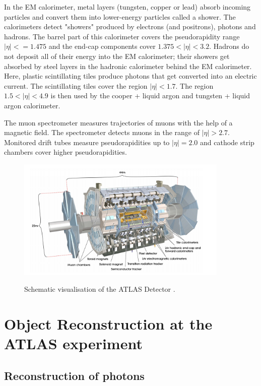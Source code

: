 In the EM calorimeter, metal layers (tungsten, copper or lead) absorb incoming particles and convert them into lower-energy particles called a shower. The calorimeters detect "showers" produced by electrons (and positrons), photons and hadrons. The barrel part of this calorimeter covers the pseudorapidity range $|\eta| < = 1.475$ and the end-cap components cover $1.375 <|\eta|< 3.2$.
Hadrons do not deposit all of their energy into the EM calorimeter; their showers get absorbed by steel layers in the hadronic calorimeter behind the EM calorimeter. 
Here, plastic scintillating tiles produce photons that get converted into an electric current. The scintillating tiles cover the region $|\eta| < 1.7$. The region $1.5 < |\eta| < 4.9$ is then used by the cooper + liquid argon and tungsten + liquid argon calorimeter.

The muon spectrometer measures trajectories of muons with the help of a magnetic field. The spectrometer detects muons in the range of $\bigl|\eta\bigr| > 2.7$. 
Monitored drift tubes measure pseudorapidities up to $|\eta| = 2.0$ and cathode strip chambers cover higher pseudorapidities.  
\begin{figure}
    \centering
    \includegraphics[width=0.9\textwidth]{Plots/atlasSCHEMA.PNG}
    \label{fig:atlasschema}
    \caption{Schematic visualisation of the ATLAS Detector \cite{Collaboration_2008}.}
\end{figure}



\section{Object Reconstruction at the ATLAS experiment}

\subsection{Reconstruction of photons}
\label{sec:reconphoton}

